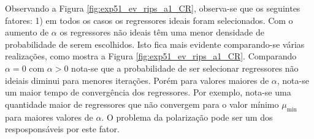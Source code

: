 \begin{exmp}
  Observando a Figura \ref{fig:exp51_ev_rips_a1_CR}, observa-se que os seguintes fatores: 1) em todos os casos os regressores ideais foram selecionados. Com o aumento de $\alpha$ os regressores não ideais têm uma menor densidade de probabilidade de serem escolhidos. Isto fica mais evidente comparando-se várias realizações, como mostra a Figura \ref{fig:exp51_ev_rips_a1_CR}. Comparando $\alpha=0$ com $\alpha>0$ nota-se que a probabilidade de ser selecionar regressores não ideiais diminui para menores iterações. Porém para valores maiores de $\alpha$, nota-se um maior tempo de convergência dos regressores. Por exemplo, nota-se uma quantidade maior de regressores que não convergem para o valor mínimo $\mu_{\min}$ para maiores valores de $\alpha$. O problema da polarização pode ser um dos resposponsáveis por este fator.


\end{exmp}

